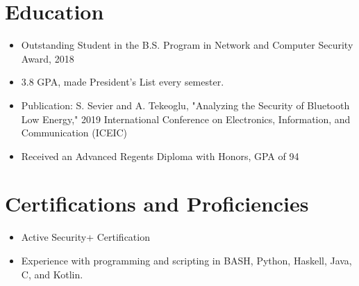 \documentclass[11pt]{resume}
\begin{document}
\section{Education}
\begin{itemize}
\item Outstanding Student in the B.S. Program in Network and Computer Security Award, 2018
\item 3.8 GPA, made President's List every semester.
\item Publication: S. Sevier and A. Tekeoglu, "Analyzing the Security of Bluetooth Low Energy," 2019 International Conference on Electronics, Information, and Communication (ICEIC)
\end{itemize}




\begin{itemize}
\item Received an Advanced Regents Diploma with Honors, GPA of 94
\end{itemize}


\section{Certifications and Proficiencies}
\begin{itemize}
\item Active Security+ Certification
\item Experience with programming and scripting in BASH, Python, Haskell, Java, C, and Kotlin.
\end{itemize}
\end{document}
